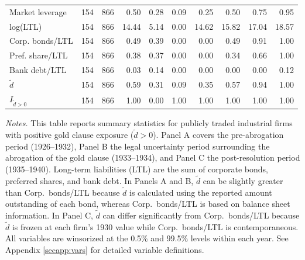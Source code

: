 \begin{table}[p]
\begin{threeparttable}
\begin{tabular}{lrrrrrrrrr}
            Market leverage & 154 & 866 & 0.50 & 0.28 & 0.09 & 0.25 & 0.50 & 0.75 & 0.95 \\
            log(LTL) & 154 & 866 & 14.44 & 5.14 & 0.00 & 14.62 & 15.82 & 17.04 & 18.57 \\
            Corp. bonds/LTL & 154 & 866 & 0.49 & 0.39 & 0.00 & 0.00 & 0.49 & 0.91 & 1.00 \\
            Pref. share/LTL & 154 & 866 & 0.38 & 0.37 & 0.00 & 0.00 & 0.34 & 0.66 & 1.00 \\
            Bank debt/LTL & 154 & 866 & 0.03 & 0.14 & 0.00 & 0.00 & 0.00 & 0.00 & 0.12 \\
            \ensuremath{\tilde{d}} & 154 & 866 & 0.59 & 0.31 & 0.09 & 0.35 & 0.57 & 0.94 & 1.00 \\
            \ensuremath{I_{\tilde{d}>0}} & 154 & 866 & 1.00 & 0.00 & 1.00 & 1.00 & 1.00 & 1.00 & 1.00 \\
            \bottomrule
        \end{tabular}
    \end{threeparttable}

    \vspace*{3mm} \justifying \noindent
\scriptsize{\textit{Notes.} This table reports summary statistics for publicly traded industrial firms with positive gold clause exposure ($\tilde{d} > 0$). Panel A covers the pre-abrogation period (1926--1932), Panel B the legal uncertainty period surrounding the abrogation of the gold clause (1933--1934), and Panel C the post-resolution period (1935--1940). Long-term liabilities (LTL) are the sum of corporate bonds, preferred shares, and bank debt. In Panels A and B, $\tilde{d}$ can be slightly greater than Corp.\ bonds/LTL because $\tilde{d}$ is calculated using the reported amount outstanding of each bond, whereas Corp.\ bonds/LTL is based on balance sheet information. In Panel C, $\tilde{d}$ can differ significantly from Corp.\ bonds/LTL because $\tilde{d}$ is frozen at each firm's 1930 value while Corp.\ bonds/LTL is contemporaneous. All variables are winsorized at the 0.5\% and 99.5\% levels within each year. See Appendix \ref{secapp:vars} for detailed variable definitions.}
\end{table}